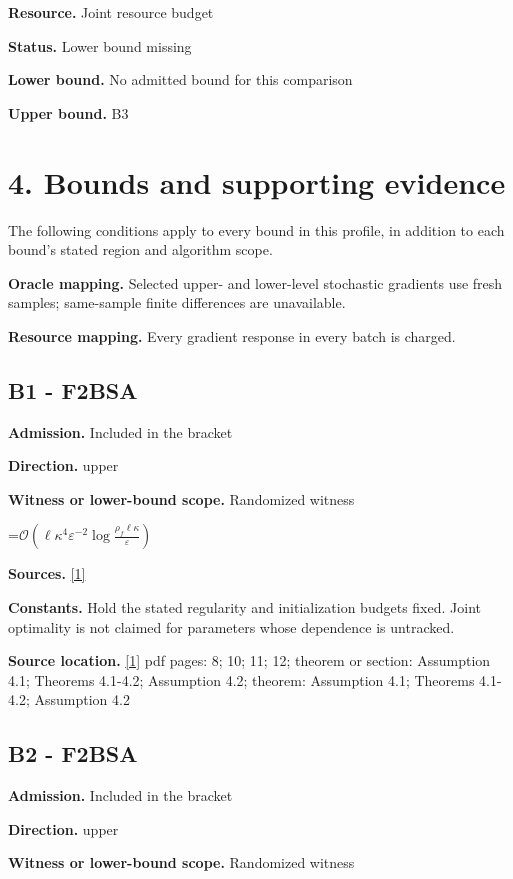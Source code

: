 \documentclass[10pt,a4paper]{article}
\newcommand{\AtlasMath}[1]{\par\begingroup\centering\setbox0=\hbox{$\displaystyle #1$}\ifdim\wd0>1.4\linewidth\typeout{ATLAS WIDE FORMULA: \the\wd0}\fi\ifdim\wd0>\linewidth\resizebox{\linewidth}{!}{\box0}\else\box0\fi\par\endgroup}
\begin{document}
\textbf{Resource.} Joint resource budget

\textbf{Status.} Lower bound missing

\textbf{Lower bound.} No admitted bound for this comparison

\textbf{Upper bound.} B3

\section{4. Bounds and supporting evidence}
The following conditions apply to every bound in this profile, in addition to each bound's stated region and algorithm scope.

\textbf{Oracle mapping.} Selected upper- and lower-level stochastic gradients use fresh samples; same-sample finite differences are unavailable.

\textbf{Resource mapping.} Every gradient response in every batch is charged.

\subsection{B1 - F2BSA}
\textbf{Admission.} Included in the bracket

\textbf{Direction.} upper

\textbf{Witness or lower-bound scope.} Randomized witness

\AtlasMath{\mathcal{O}\!\left(\ell\kappa^4\varepsilon^{-2}\log\frac{\rho_f\ell\kappa}{\varepsilon}\right)}
\textbf{Sources.} \href{https://proceedings.mlr.press/v247/chen24a/chen24a.pdf}{[1]}

\textbf{Constants.} Hold the stated regularity and initialization budgets fixed. Joint optimality is not claimed for parameters whose dependence is untracked.

\textbf{Source location.} \href{https://proceedings.mlr.press/v247/chen24a/chen24a.pdf}{[1]} pdf pages: 8; 10; 11; 12; theorem or section: Assumption 4.1; Theorems 4.1-4.2; Assumption 4.2; theorem: Assumption 4.1; Theorems 4.1-4.2; Assumption 4.2

\subsection{B2 - F2BSA}
\textbf{Admission.} Included in the bracket

\textbf{Direction.} upper

\textbf{Witness or lower-bound scope.} Randomized witness
\end{document}
